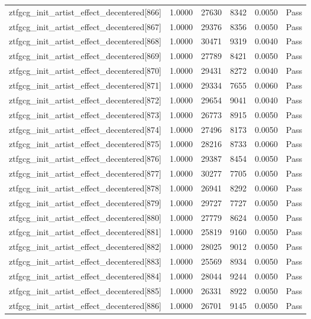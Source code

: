 \begin{table}[htbp]
\begin{tabular}{llrrll}
ztfgcg\_init\_artist\_effect\_decentered[866] & 1.0000 & 27630 & 8342 & 0.0050 & Pass \\
ztfgcg\_init\_artist\_effect\_decentered[867] & 1.0000 & 29376 & 8356 & 0.0050 & Pass \\
ztfgcg\_init\_artist\_effect\_decentered[868] & 1.0000 & 30471 & 9319 & 0.0040 & Pass \\
ztfgcg\_init\_artist\_effect\_decentered[869] & 1.0000 & 27789 & 8421 & 0.0050 & Pass \\
ztfgcg\_init\_artist\_effect\_decentered[870] & 1.0000 & 29431 & 8272 & 0.0040 & Pass \\
ztfgcg\_init\_artist\_effect\_decentered[871] & 1.0000 & 29334 & 7655 & 0.0060 & Pass \\
ztfgcg\_init\_artist\_effect\_decentered[872] & 1.0000 & 29654 & 9041 & 0.0040 & Pass \\
ztfgcg\_init\_artist\_effect\_decentered[873] & 1.0000 & 26773 & 8915 & 0.0050 & Pass \\
ztfgcg\_init\_artist\_effect\_decentered[874] & 1.0000 & 27496 & 8173 & 0.0050 & Pass \\
ztfgcg\_init\_artist\_effect\_decentered[875] & 1.0000 & 28216 & 8733 & 0.0060 & Pass \\
ztfgcg\_init\_artist\_effect\_decentered[876] & 1.0000 & 29387 & 8454 & 0.0050 & Pass \\
ztfgcg\_init\_artist\_effect\_decentered[877] & 1.0000 & 30277 & 7705 & 0.0050 & Pass \\
ztfgcg\_init\_artist\_effect\_decentered[878] & 1.0000 & 26941 & 8292 & 0.0060 & Pass \\
ztfgcg\_init\_artist\_effect\_decentered[879] & 1.0000 & 29727 & 7727 & 0.0050 & Pass \\
ztfgcg\_init\_artist\_effect\_decentered[880] & 1.0000 & 27779 & 8624 & 0.0050 & Pass \\
ztfgcg\_init\_artist\_effect\_decentered[881] & 1.0000 & 25819 & 9160 & 0.0050 & Pass \\
ztfgcg\_init\_artist\_effect\_decentered[882] & 1.0000 & 28025 & 9012 & 0.0050 & Pass \\
ztfgcg\_init\_artist\_effect\_decentered[883] & 1.0000 & 25569 & 8934 & 0.0050 & Pass \\
ztfgcg\_init\_artist\_effect\_decentered[884] & 1.0000 & 28044 & 9244 & 0.0050 & Pass \\
ztfgcg\_init\_artist\_effect\_decentered[885] & 1.0000 & 26331 & 8922 & 0.0050 & Pass \\
ztfgcg\_init\_artist\_effect\_decentered[886] & 1.0000 & 26701 & 9145 & 0.0050 & Pass \\

\end{tabular}
\end{table}
